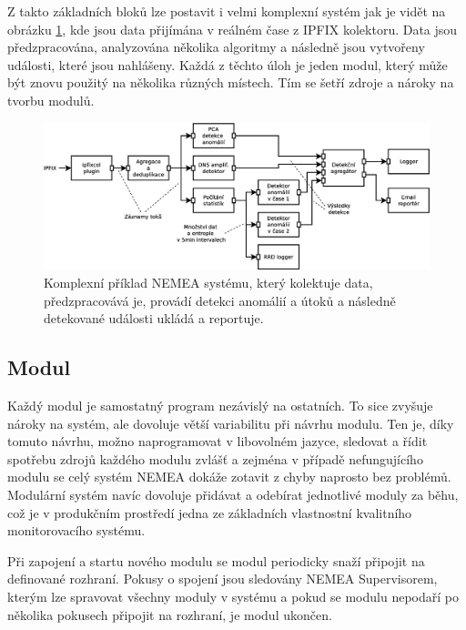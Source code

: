 Z takto základních bloků lze postavit i velmi komplexní systém jak je vidět na obrázku \ref{fig:nemea-example-2}, kde jsou data přijímána v reálném čase z IPFIX\cite{ipfix} kolektoru. Data jsou předzpracována, analyzována několika algoritmy a následně jsou vytvořeny události, které jsou nahlášeny. Každá z těchto úloh je jeden modul, který může být znovu použitý na několika různých místech. Tím se šetří zdroje a nároky na tvorbu modulů.

\begin{figure}[h]
    \centering
    \includegraphics[width=1\textwidth]{fig/nemea-example-2-cz.eps}
    \caption{Komplexní příklad NEMEA systému, který kolektuje data, předzpracovává je, provádí detekci anomálií a útoků a následně detekované události ukládá a reportuje.} \label{fig:nemea-example-2}
  
\end{figure}



\subsection{Modul}

Každý modul je samostatný program nezávislý na ostatních. To sice zvyšuje nároky na systém, ale dovoluje větší variabilitu při návrhu modulu. Ten je, díky tomuto návrhu, možno naprogramovat v libovolném jazyce, sledovat a řídit spotřebu zdrojů každého modulu zvlášť a zejména v případě nefungujícího modulu se celý systém NEMEA dokáže zotavit z chyby naprosto bez problémů. Modulární systém navíc dovoluje přidávat a odebírat jednotlivé moduly za běhu, což je v produkčním prostředí jedna ze základních vlastnostní kvalitního monitorovacího systému.

Při zapojení a startu nového modulu se modul periodicky snaží připojit na definované rozhraní. Pokusy o spojení jsou sledovány NEMEA Supervisorem, kterým lze spravovat všechny moduly v systému a pokud se modulu nepodaří po několika pokusech připojit na rozhraní, je modul ukončen.

